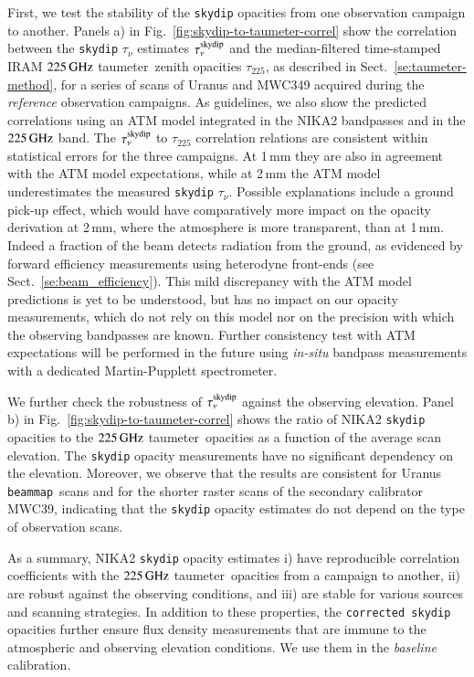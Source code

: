\documentclass[traditionalabstract]{aa}
\newcommand{\bm}{{\tt beammap}}
\newcommand{\taunu}{\tau_{\nu}}
\newcommand{\taumeter}{taumeter}
\newcommand{\lp}[1]{#1}
\newcommand{\rev}[1]{#1}
\begin{document}
First, we test the stability of the {\tt skydip} opacities from one
observation campaign to
another. Panels a) in Fig.~\ref{fig:skydip-to-taumeter-correl} show the
correlation between the {\tt skydip} $\taunu$ estimates $\taunu^{\rm{skydip}}$
and the median-filtered time-stamped IRAM $225\,\rm{GHz}$ \taumeter\ 
zenith opacities $\tau_{225}$, as described in
Sect.~\ref{se:taumeter-method}, for a series of scans
of Uranus and MWC349 acquired during the \emph{reference} observation
campaigns. As guidelines,
we also show the predicted correlations using an ATM model integrated
in the NIKA2 bandpasses and in the $225\,\rm{GHz}$ band. {\lp The
$\taunu^{\rm{skydip}}$ to $\tau_{225}$ correlation relations are
consistent within statistical errors for the three campaigns.}
At 1\,mm they are also in agreement with the ATM model expectations,
while at 2\,mm the ATM model underestimates the measured {\tt skydip}
$\taunu$. {\rev Possible explanations include a ground pick-up effect,
which would have comparatively more impact on the opacity derivation
at 2\,mm, where the atmosphere is more transparent, than at
1\,mm. Indeed a fraction of the beam detects radiation from the
ground, as evidenced by forward efficiency measurements using
heterodyne front-ends (see Sect.~\ref{se:beam_efficiency}).}
This mild discrepancy with the ATM model predictions is yet to be
understood, but has no impact on
our opacity measurements, which do not rely on this model nor on
the precision with which the observing bandpasses are known. {\lp
Further consistency test with ATM expectations will be performed in the
future using \emph{in-situ} bandpass measurements with a
dedicated Martin-Pupplett spectrometer.}


We further check the robustness of $\taunu^{\rm{skydip}}$ against the
observing elevation. 
Panel b) in Fig.~\ref{fig:skydip-to-taumeter-correl} shows the ratio of NIKA2
{\tt skydip} opacities to the $225\,\rm{GHz}$ \taumeter\ opacities as a function of
the average scan elevation. The {\tt skydip} opacity measurements have
no significant dependency on the elevation. Moreover, we observe that
the results are consistent for Uranus \bm\ scans and for
the shorter raster scans of the secondary calibrator MWC39, indicating
that the {\tt skydip} opacity estimates do not depend on the type of
observation scans.


As a summary, NIKA2 {\tt skydip} opacity estimates i) have reproducible
correlation coefficients with the $225\,\rm{GHz}$ \taumeter\ opacities from a
campaign to another, ii) are robust against the observing conditions,
and iii) are stable for various sources and scanning strategies. {\lp
In addition to these properties, the {\tt corrected skydip} opacities
further ensure flux density measurements that are immune to the
atmospheric and observing elevation conditions. We use them in
the \emph{baseline} calibration.}
\end{document}
